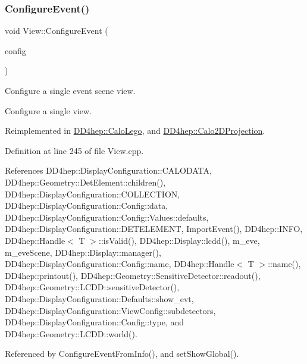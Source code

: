 \subsubsection{\texorpdfstring{Configure\+Event()}{ConfigureEvent()}}
{\footnotesize\ttfamily void View\+::\+Configure\+Event (\begin{DoxyParamCaption}\item[{const \hyperlink{class_d_d4hep_1_1_display_configuration_1_1_view_config}{Display\+Configuration\+::\+View\+Config} \&}]{config }\end{DoxyParamCaption})\hspace{0.3cm}{\ttfamily [virtual]}}



Configure a single event scene view. 

Configure a single view. 

Reimplemented in \hyperlink{class_d_d4hep_1_1_calo_lego_a997e3fea32d37374ef4c6c95e087af9c}{D\+D4hep\+::\+Calo\+Lego}, and \hyperlink{class_d_d4hep_1_1_calo2_d_projection_ab49fa4071160750bd2c82e68b2f6d524}{D\+D4hep\+::\+Calo2\+D\+Projection}.



Definition at line 245 of file View.\+cpp.



References D\+D4hep\+::\+Display\+Configuration\+::\+C\+A\+L\+O\+D\+A\+TA, D\+D4hep\+::\+Geometry\+::\+Det\+Element\+::children(), D\+D4hep\+::\+Display\+Configuration\+::\+C\+O\+L\+L\+E\+C\+T\+I\+ON, D\+D4hep\+::\+Display\+Configuration\+::\+Config\+::data, D\+D4hep\+::\+Display\+Configuration\+::\+Config\+::\+Values\+::defaults, D\+D4hep\+::\+Display\+Configuration\+::\+D\+E\+T\+E\+L\+E\+M\+E\+NT, Import\+Event(), D\+D4hep\+::\+I\+N\+FO, D\+D4hep\+::\+Handle$<$ T $>$\+::is\+Valid(), D\+D4hep\+::\+Display\+::lcdd(), m\+\_\+eve, m\+\_\+eve\+Scene, D\+D4hep\+::\+Display\+::manager(), D\+D4hep\+::\+Display\+Configuration\+::\+Config\+::name, D\+D4hep\+::\+Handle$<$ T $>$\+::name(), D\+D4hep\+::printout(), D\+D4hep\+::\+Geometry\+::\+Sensitive\+Detector\+::readout(), D\+D4hep\+::\+Geometry\+::\+L\+C\+D\+D\+::sensitive\+Detector(), D\+D4hep\+::\+Display\+Configuration\+::\+Defaults\+::show\+\_\+evt, D\+D4hep\+::\+Display\+Configuration\+::\+View\+Config\+::subdetectors, D\+D4hep\+::\+Display\+Configuration\+::\+Config\+::type, and D\+D4hep\+::\+Geometry\+::\+L\+C\+D\+D\+::world().



Referenced by Configure\+Event\+From\+Info(), and set\+Show\+Global().

